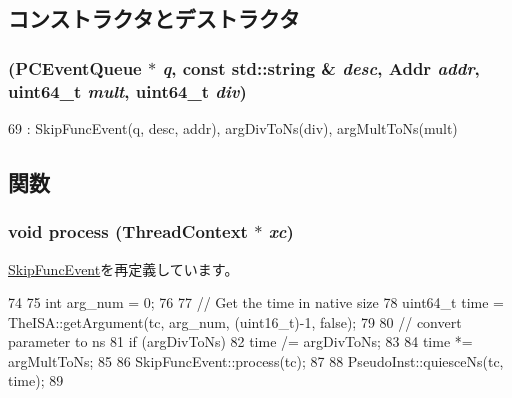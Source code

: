 \subsection{コンストラクタとデストラクタ}
\hypertarget{classLinux_1_1UDelayEvent_a0b3c05abde3a4fc6b3ee00842bc8cd19}{
\subsubsection[{UDelayEvent}]{ ({\bf PCEventQueue} $\ast$ {\em q}, \/  const std::string \& {\em desc}, \/  {\bf Addr} {\em addr}, \/  uint64\_\-t {\em mult}, \/  uint64\_\-t {\em div})}}
\label{classLinux_1_1UDelayEvent_a0b3c05abde3a4fc6b3ee00842bc8cd19}



\begin{DoxyCode}
69         : SkipFuncEvent(q, desc, addr), argDivToNs(div), argMultToNs(mult) {}
\end{DoxyCode}


\subsection{関数}
\hypertarget{classLinux_1_1UDelayEvent_a7f346b2e15a406283e587b1123735488}{
\subsubsection[{process}]{\setlength{\rightskip}{0pt plus 5cm}void process ({\bf ThreadContext} $\ast$ {\em xc})}}
\label{classLinux_1_1UDelayEvent_a7f346b2e15a406283e587b1123735488}


\hyperlink{classSkipFuncEvent_ad66a9d5ec7cfe597b848a17c0df5cc28}{SkipFuncEvent}を再定義しています。


\begin{DoxyCode}
74 {
75     int arg_num  = 0;
76 
77     // Get the time in native size
78     uint64_t time = TheISA::getArgument(tc, arg_num,  (uint16_t)-1, false);
79 
80     // convert parameter to ns
81     if (argDivToNs)
82         time /= argDivToNs;
83 
84     time *= argMultToNs;
85 
86     SkipFuncEvent::process(tc);
87 
88     PseudoInst::quiesceNs(tc, time);
89 }
\end{DoxyCode}


